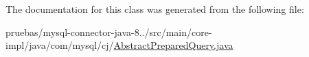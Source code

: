 The documentation for this class was generated from the following file\+:\begin{DoxyCompactItemize}
\item 
pruebas/mysql-\/connector-\/java-\/8../src/main/core-\/impl/java/com/mysql/cj/\mbox{\hyperlink{_abstract_prepared_query_8java}{Abstract\+Prepared\+Query.\+java}}\end{DoxyCompactItemize}
